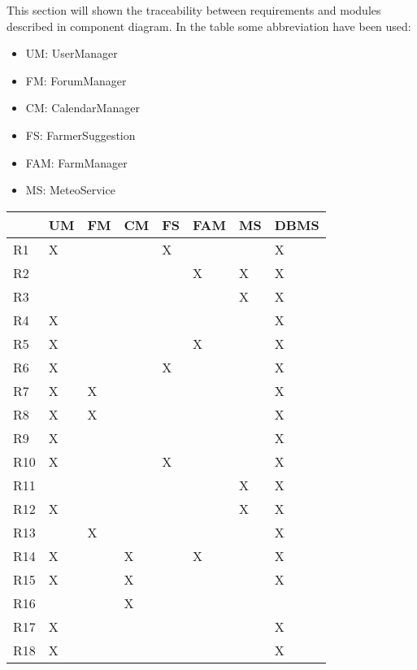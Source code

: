 This section will shown the traceability between requirements and modules
described in component diagram.
In the table some abbreviation have been used:
\begin{itemize}
    \item UM: UserManager
    \item FM: ForumManager
    \item CM: CalendarManager
    \item FS: FarmerSuggestion
    \item FAM: FarmManager
    \item MS: MeteoService
\end{itemize}

\begin{table}[]
    \begin{tabular}{|l|l|l|l|l|l|l|l|}
    \hline
        & UM & FM & CM & FS & FAM & MS & DBMS \\ \hline
    R1  & X  &    &    & X  &     &    & X    \\ \hline
    R2  &    &    &    &    & X   & X  & X    \\ \hline
    R3  &    &    &    &    &     & X  & X    \\ \hline
    R4  & X  &    &    &    &     &    & X    \\ \hline
    R5  & X  &    &    &    & X   &    & X    \\ \hline
    R6  & X  &    &    & X  &     &    & X    \\ \hline
    R7  & X  & X  &    &    &     &    & X    \\ \hline
    R8  & X  & X  &    &    &     &    & X    \\ \hline
    R9  & X  &    &    &    &     &    & X    \\ \hline
    R10 & X  &    &    & X  &     &    & X    \\ \hline
    R11 &    &    &    &    &     & X  & X    \\ \hline
    R12 & X  &    &    &    &     & X  & X    \\ \hline
    R13 &    & X  &    &    &     &    & X    \\ \hline
    R14 & X  &    & X  &    & X   &    & X    \\ \hline
    R15 & X  &    & X  &    &     &    & X    \\ \hline
    R16 &    &    & X  &    &     &    &      \\ \hline
    R17 & X  &    &    &    &     &    & X    \\ \hline
    R18 & X  &    &    &    &     &    & X    \\ \hline

\end{tabular}
\end{table}
